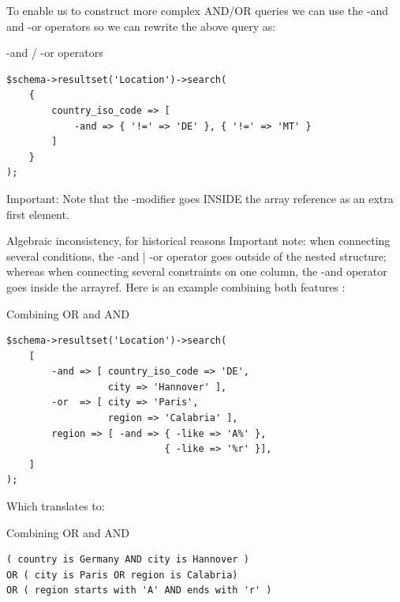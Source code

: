 To enable us to construct more complex AND/OR queries we can use the -and and -or operators so we can rewrite the above query as:

\begin{frame}[fragile]{-and / -or operators}
\begin{lstlisting}
$schema->resultset('Location')->search(
    {
        country_iso_code => [
            -and => { '!=' => 'DE' }, { '!=' => 'MT' }
        ]
    }
);
\end{lstlisting}
\end{frame}

Important: Note that the -modifier goes INSIDE the array reference as an extra first element. 

Algebraic inconsistency, for historical reasons
Important note: when connecting several conditions, the -and | -or operator goes outside of the nested structure; whereas when connecting several constraints on one column, the -and operator goes inside the arrayref. Here is an example combining both features :

\begin{frame}[fragile]{Combining OR and AND}

\begin{lstlisting}
$schema->resultset('Location')->search(
    [
        -and => [ country_iso_code => 'DE', 
                  city => 'Hannover' ],
        -or  => [ city => 'Paris', 
                  region => 'Calabria' ],
        region => [ -and => { -like => 'A%' }, 
                            { -like => '%r' }],
    ]
);
\end{lstlisting}
\end{frame}

Which translates to:

\begin{frame}[fragile]{Combining OR and AND}

\begin{lstlisting}
( country is Germany AND city is Hannover )
OR ( city is Paris OR region is Calabria)
OR ( region starts with 'A' AND ends with 'r' )
\end{lstlisting}

\end{frame}

